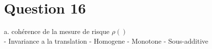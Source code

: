 \section{Question 16}

a. cohérence de la mesure de risque $\rho()$\\
- Invariance a la translation
- Homogene
- Monotone
- Sous-additive